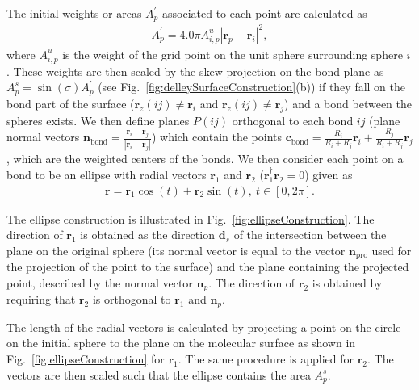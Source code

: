 The initial weights or areas $A_p^\prime$ associated to each point are calculated as
\begin{align}
	A_p^\prime = 4.0\pi A_{i,p}^{u}|\pmb{r}_p-\pmb{r}_i|^2,
\end{align}
where $A_{i,p}^{u}$ is the weight of the grid point on the unit sphere surrounding sphere $i$.
These weights are then scaled by the skew projection on the bond plane as $A_p^s = \sin(\sigma) A_p^\prime$
(see Fig.~\ref{fig:delleySurfaceConstruction}(b)) if they fall on the bond part of the surface
($\pmb{r}_z(ij) \neq \pmb{r}_i$ and $\pmb{r}_z(ij) \neq \pmb{r}_j$) and a bond between the spheres exists.
We then define planes $P(ij)$ orthogonal to each bond $ij$ (plane normal vectors
$\pmb{n}_\mathrm{bond} = \frac{\pmb{r}_i-\pmb{r}_j}{|\pmb{r}_i-\pmb{r}_j|}$) which contain the points
$\pmb{c}_\mathrm{bond} = \frac{R_i}{R_i+R_j} \pmb{r}_i +\frac{R_j}{R_i+R_j} \pmb{r}_j$, which
are the weighted centers of the bonds. We then consider each point on a bond to be an ellipse with
radial vectors $\pmb{r}_1$ and $\pmb{r}_2$ ($\pmb{r}_1^\dagger\pmb{r}_2 = 0$) given as
\begin{align}
	\pmb{r} = \pmb{r}_1 \cos(t) + \pmb{r}_2 \sin(t),~t\in [0,2\pi].
\end{align}

The ellipse construction is illustrated in Fig.~\ref{fig:ellipseConstruction}.
The direction of $\pmb{r}_1$ is obtained as the direction $\pmb{d}_s$ of the intersection between
the plane on the original sphere (its normal vector is equal to the vector $\pmb{n}_\mathrm{pro}$
used for the projection of the point to the surface) and the plane containing
the projected point, described by the normal vector $\pmb{n}_p$. The direction of $\pmb{r}_2$ is obtained by
requiring that $\pmb{r}_2$ is orthogonal to $\pmb{r}_1$ and $\pmb{n}_p$.

The length of the radial vectors is calculated by projecting a point on the circle
on the initial sphere to the plane on the molecular surface as shown in Fig.~\ref{fig:ellipseConstruction}
for $\pmb{r}_1$. The same procedure is applied for $\pmb{r}_2$. The vectors are then scaled such that
the ellipse contains the area $A_p^s$.


